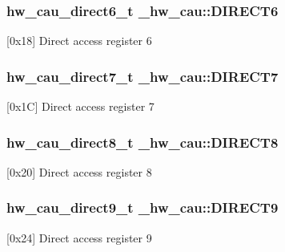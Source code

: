 \subsubsection[{\texorpdfstring{D\+I\+R\+E\+C\+T6}{DIRECT6}}]{ {\bf hw\+\_\+cau\+\_\+direct6\+\_\+t} \+\_\+hw\+\_\+cau\+::\+D\+I\+R\+E\+C\+T6}\hypertarget{struct__hw__cau_ae031d2acb5b699611229f6c02a1a20ea}{}\label{struct__hw__cau_ae031d2acb5b699611229f6c02a1a20ea}
\mbox{[}0x18\mbox{]} Direct access register 6 
\subsubsection[{\texorpdfstring{D\+I\+R\+E\+C\+T7}{DIRECT7}}]{ {\bf hw\+\_\+cau\+\_\+direct7\+\_\+t} \+\_\+hw\+\_\+cau\+::\+D\+I\+R\+E\+C\+T7}\hypertarget{struct__hw__cau_a8e4cc81641ee6badbcb442463aa4475e}{}\label{struct__hw__cau_a8e4cc81641ee6badbcb442463aa4475e}
\mbox{[}0x1C\mbox{]} Direct access register 7 
\subsubsection[{\texorpdfstring{D\+I\+R\+E\+C\+T8}{DIRECT8}}]{ {\bf hw\+\_\+cau\+\_\+direct8\+\_\+t} \+\_\+hw\+\_\+cau\+::\+D\+I\+R\+E\+C\+T8}\hypertarget{struct__hw__cau_a7b516182d43b9506b045cec54dd4a8a1}{}\label{struct__hw__cau_a7b516182d43b9506b045cec54dd4a8a1}
\mbox{[}0x20\mbox{]} Direct access register 8 
\subsubsection[{\texorpdfstring{D\+I\+R\+E\+C\+T9}{DIRECT9}}]{ {\bf hw\+\_\+cau\+\_\+direct9\+\_\+t} \+\_\+hw\+\_\+cau\+::\+D\+I\+R\+E\+C\+T9}\hypertarget{struct__hw__cau_a56737f820a5ff38331424c46c532f049}{}\label{struct__hw__cau_a56737f820a5ff38331424c46c532f049}
\mbox{[}0x24\mbox{]} Direct access register 9 
